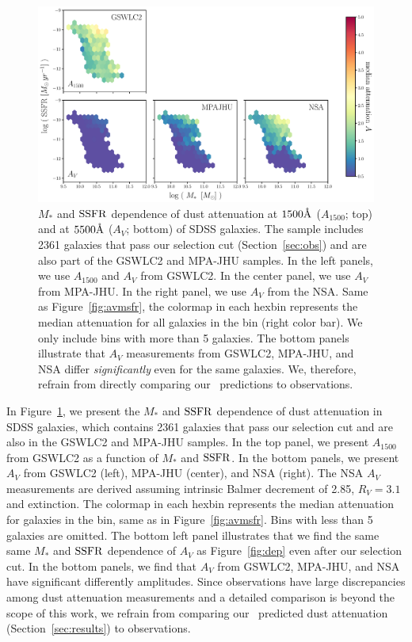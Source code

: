 \begin{figure}
\begin{center}
    \includegraphics[width=\textwidth]{figs/av_mssfr_obs.pdf}
    \caption{\label{fig:av_obs}
    $M_*$ and ${\rm SSFR}$ dependence of dust attenuation at $1500 \AA$
    ($A_{1500}$; top) and at $5500\AA$ ($A_{V}$; bottom) of SDSS galaxies. 
    The sample includes 2361 galaxies that pass our selection cut
    (Section~\ref{sec:obs}) and are also part of the GSWLC2 and MPA-JHU
    samples. 
    In the left panels, we use $A_{1500}$ and $A_V$ from GSWLC2.
    In the center panel, we use $A_V$ from MPA-JHU. 
    In the right panel, we use $A_V$ from the NSA. 
    Same as Figure~\ref{fig:avmsfr}, the colormap in each hexbin represents the
    median attenuation for all galaxies in the bin (right color bar).
    We only include bins with more than 5 galaxies.
    The bottom panels illustrate that $A_V$ measurements from GSWLC2, MPA-JHU,
    and NSA differ {\em significantly} even for the same galaxies.
    We, therefore, refrain from directly comparing our \eda~predictions to
    observations. 
    }
\end{center}
\end{figure}

In Figure~\ref{fig:av_obs}, we present the $M_*$ and ${\rm SSFR}$ dependence of dust
attenuation in SDSS galaxies, which contains 2361 galaxies that pass our
selection cut and are also in the GSWLC2 and MPA-JHU samples.
In the top panel, we present $A_{1500}$ from GSWLC2 as a function of $M_*$ and
${\rm SSFR}$.
In the bottom panels, we present $A_V$ from GSWLC2 (left), MPA-JHU (center),
and NSA (right).
The NSA $A_V$ measurements are derived assuming intrinsic Balmer decrement of
2.85, $R_V=3.1$ and \cite{odonnell1994} extinction. 
The colormap in each hexbin represents the median attenuation for galaxies in
the bin, same  as in Figure~\ref{fig:avmsfr}. 
Bins with less than 5 galaxies are omitted. 
The bottom left panel illustrates that we find the same same $M_*$ and ${\rm SSFR}$
dependence of $A_V$ as Figure~\ref{fig:dep} even after our selection cut. 
In the bottom panels, we find that $A_V$ from GSWLC2, MPA-JHU, and NSA have
significant differently amplitudes. 
Since observations have large discrepancies among dust attenuation measurements
and a detailed comparison is beyond the scope of this work, we refrain from
comparing our \eda~predicted dust attenuation (Section~\ref{sec:results}) to
observations.
